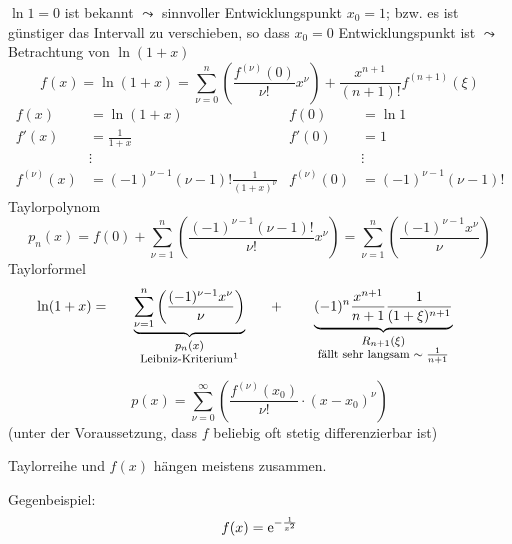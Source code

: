 \begin{example}[Logarithmus]\label{ex:logarithmus_taylor}
  $\ln 1 = 0$ ist bekannt $\leadsto$ sinnvoller Entwicklungspunkt $x_0 = 1$; bzw. es ist günstiger das Intervall zu verschieben, so dass $x_0 = 0$ Entwicklungspunkt ist $\leadsto$ Betrachtung von $\ln (1+x)$
  \[ f(x) = \ln (1+x) = \sum_{\nu = 0}^n \left( \frac{f^{(\nu)}(0)}{\nu !} x^\nu \right) + \frac{x^{n+1}}{(n+1)!} f^{(n+1)}(\xi) \]
  \begin{align*}
    f(x) &= \ln (1+x) & f(0) &= \ln 1 \\
    f'(x) &= \frac 1 {1+x} & f'(0) &= 1 \\
    &\vdots & &\vdots \\
    f^{(\nu)}(x) &= (-1)^{\nu-1} (\nu - 1)! \frac 1 {(1+x)^\nu} & f^{(\nu)}(0) &= (-1)^{\nu-1} (\nu -1)!
  \end{align*}
  Taylorpolynom
  \[
    p_n(x) = f(0) + \sum_{\nu = 1}^{n} \left( \frac{(-1)^{\nu-1} (\nu -1)!}{\nu !} x^\nu \right)
    = \sum_{\nu = 1}^{n} \left( \frac{(-1)^{\nu-1} x^\nu}{\nu} \right)
  \]
  Taylorformel
  \[
    \ln (1+x) = \underbrace{\sum_{\nu = 1}^{n} \left( \frac{(-1)^{\nu-1} x^\nu}{\nu} \right)}_{\parbox{4cm}{\centering\footnotesize $p_n(x)$\\Leibniz-Kriterium\footnotemark}} + \underbrace{(-1)^n \frac{x^{n+1}}{n+1} \frac 1 {(1+\xi)^{n+1}}}_{\parbox{5cm}{\centering \footnotesize $R_{n+1}(\xi)$\\fällt sehr langsam $\sim \frac 1 {n+1}$}}
  \]
\end{example}

\begin{definition}[Taylorreihe]
  \[ p(x) = \sum_{\nu = 0}^\infty \left( \frac{f^{(\nu)}(x_0)}{\nu !} \cdot (x - x_0)^\nu \right) \]
  (unter der Voraussetzung, dass $f$ beliebig oft stetig differenzierbar ist)
\end{definition}

\begin{note}
  Taylorreihe und $f(x)$ hängen meistens zusammen.
\end{note}

\noindent Gegenbeispiel:
\[
  f(x) = \operatorname{e}^{-\frac 1 {x^2}}
\]